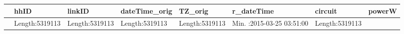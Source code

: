 \documentclass[]{article}
\theoremstyle{definition}
\theoremstyle{definition}
\theoremstyle{definition}
\theoremstyle{remark}
\begin{document}
\begin{longtable}[]{@{}llllllll@{}}
\toprule
\begin{minipage}[b]{0.02\columnwidth}\raggedright\strut
\strut
\end{minipage} & \begin{minipage}[b]{0.10\columnwidth}\raggedright\strut
hhID\strut
\end{minipage} & \begin{minipage}[b]{0.10\columnwidth}\raggedright\strut
linkID\strut
\end{minipage} & \begin{minipage}[b]{0.10\columnwidth}\raggedright\strut
dateTime\_orig\strut
\end{minipage} & \begin{minipage}[b]{0.10\columnwidth}\raggedright\strut
TZ\_orig\strut
\end{minipage} & \begin{minipage}[b]{0.16\columnwidth}\raggedright\strut
r\_dateTime\strut
\end{minipage} & \begin{minipage}[b]{0.10\columnwidth}\raggedright\strut
circuit\strut
\end{minipage} & \begin{minipage}[b]{0.09\columnwidth}\raggedright\strut
powerW\strut
\end{minipage}\tabularnewline
\midrule
\endhead
\begin{minipage}[t]{0.02\columnwidth}\raggedright\strut
\strut
\end{minipage} & \begin{minipage}[t]{0.10\columnwidth}\raggedright\strut
Length:5319113\strut
\end{minipage} & \begin{minipage}[t]{0.10\columnwidth}\raggedright\strut
Length:5319113\strut
\end{minipage} & \begin{minipage}[t]{0.10\columnwidth}\raggedright\strut
Length:5319113\strut
\end{minipage} & \begin{minipage}[t]{0.10\columnwidth}\raggedright\strut
Length:5319113\strut
\end{minipage} & \begin{minipage}[t]{0.16\columnwidth}\raggedright\strut
Min. :2015-03-25 03:51:00\strut
\end{minipage} & \begin{minipage}[t]{0.10\columnwidth}\raggedright\strut
Length:5319113\strut

\end{minipage}
\end{longtable}
\end{document}
